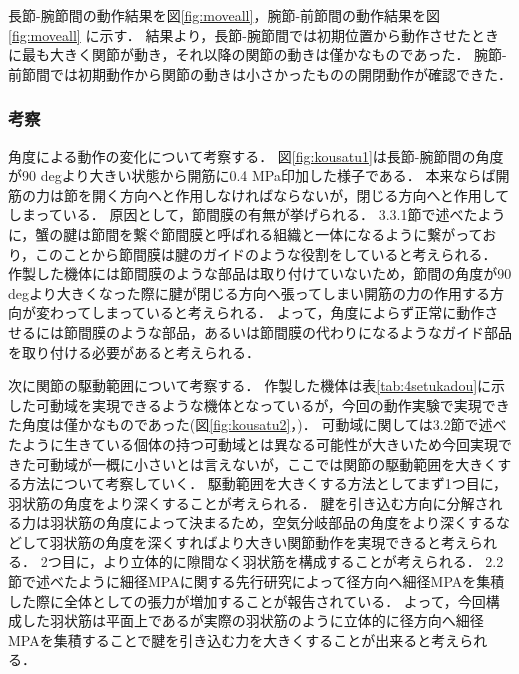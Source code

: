 長節-腕節間の動作結果を図\ref{fig:moveall}，腕節-前節間の動作結果を図\ref{fig:moveall} に示す．
結果より，長節-腕節間では初期位置から動作させたときに最も大きく関節が動き，それ以降の関節の動きは僅かなものであった．
腕節-前節間では初期動作から関節の動きは小さかったものの開閉動作が確認できた．
\subsubsection{考察}
角度による動作の変化について考察する．
図\ref{fig:kousatu1}は長節-腕節間の角度が90 degより大きい状態から開筋に0.4 MPa印加した様子である．
本来ならば開筋の力は節を開く方向へと作用しなければならないが，閉じる方向へと作用してしまっている．
原因として，節間膜の有無が挙げられる．
3.3.1節で述べたように，蟹の腱は節間を繋ぐ節間膜と呼ばれる組織と一体になるように繋がっており，このことから節間膜は腱のガイドのような役割をしていると考えられる．
作製した機体には節間膜のような部品は取り付けていないため，節間の角度が90 degより大きくなった際に腱が閉じる方向へ張ってしまい開筋の力の作用する方向が変わってしまっていると考えられる．
よって，角度によらず正常に動作させるには節間膜のような部品，あるいは節間膜の代わりになるようなガイド部品を取り付ける必要があると考えられる．

次に関節の駆動範囲について考察する．
作製した機体は表\ref{tab:4setukadou}に示した可動域を実現できるような機体となっているが，今回の動作実験で実現できた角度は僅かなものであった(図\ref{fig:kousatu2}，)．
可動域に関しては3.2節で述べたように生きている個体の持つ可動域とは異なる可能性が大きいため今回実現できた可動域が一概に小さいとは言えないが，ここでは関節の駆動範囲を大きくする方法について考察していく．
駆動範囲を大きくする方法としてまず1つ目に，羽状筋の角度をより深くすることが考えられる．
腱を引き込む方向に分解される力は羽状筋の角度によって決まるため，空気分岐部品の角度をより深くするなどして羽状筋の角度を深くすればより大きい関節動作を実現できると考えられる．
2つ目に，より立体的に隙間なく羽状筋を構成することが考えられる．
2.2節で述べたように細径MPAに関する先行研究\cite{1390282680917523328}によって径方向へ細径MPAを集積した際に全体としての張力が増加することが報告されている．
よって，今回構成した羽状筋は平面上であるが実際の羽状筋のように立体的に径方向へ細径MPAを集積することで腱を引き込む力を大きくすることが出来ると考えられる．
